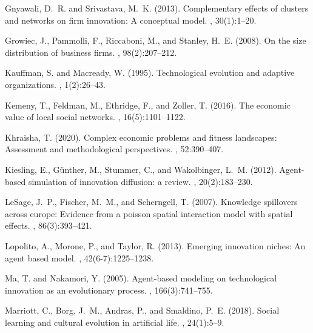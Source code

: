 \documentclass[letterpaper]{article}
\begin{document}
\begin{thebibliography}{}
Gnyawali, D.~R. and Srivastava, M.~K. (2013).
\newblock Complementary effects of clusters and networks on firm innovation: A
  conceptual model.
, 30(1):1--20.

Growiec, J., Pammolli, F., Riccaboni, M., and Stanley, H.~E. (2008).
\newblock On the size distribution of business firms.
, 98(2):207--212.

Kauffman, S. and Macready, W. (1995).
\newblock Technological evolution and adaptive organizations.
, 1(2):26--43.

Kemeny, T., Feldman, M., Ethridge, F., and Zoller, T. (2016).
\newblock The economic value of local social networks.
, 16(5):1101--1122.

Khraisha, T. (2020).
\newblock Complex economic problems and fitness landscapes: Assessment and
  methodological perspectives.
, 52:390--407.

Kiesling, E., G{\"u}nther, M., Stummer, C., and Wakolbinger, L.~M. (2012).
\newblock Agent-based simulation of innovation diffusion: a review.
,
  20(2):183--230.

LeSage, J.~P., Fischer, M.~M., and Scherngell, T. (2007).
\newblock Knowledge spillovers across europe: Evidence from a poisson spatial
  interaction model with spatial effects.
, 86(3):393--421.

Lopolito, A., Morone, P., and Taylor, R. (2013).
\newblock Emerging innovation niches: An agent based model.
, 42(6-7):1225--1238.

Ma, T. and Nakamori, Y. (2005).
\newblock Agent-based modeling on technological innovation as an evolutionary
  process.
, 166(3):741--755.

Marriott, C., Borg, J.~M., Andras, P., and Smaldino, P.~E. (2018).
\newblock Social learning and cultural evolution in artificial life.
, 24(1):5--9.


\end{thebibliography}
\end{document}
